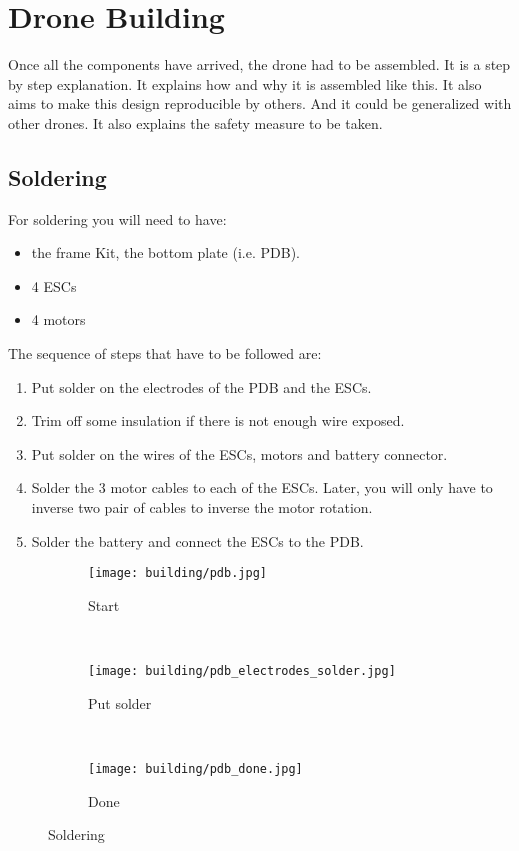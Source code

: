 \chapter{Drone Building}

Once all the components have arrived, the drone had to be assembled. It is a step by step explanation.
It explains how and why it is assembled like this.
It also aims to make this design reproducible by others.
And it could be generalized with other drones.
It also explains the safety measure to be taken.

\section{Soldering}
For soldering you will need to have:
\begin{itemize}
    \item the frame Kit, the bottom plate (i.e. PDB).
    \item 4 ESCs
    \item 4 motors
\end{itemize}
The sequence of steps that have to be followed are:
\begin{enumerate}
    \item Put solder on the electrodes of the PDB and the ESCs.
    \item Trim off some insulation if there is not enough wire exposed.
    \item Put solder on the wires of the ESCs, motors and battery connector.
    \item Solder the 3 motor cables to each of the ESCs. Later, you will only have to inverse two pair of cables to inverse the motor rotation.
    \item Solder the battery and connect the ESCs to the PDB.
\end{enumerate}
\begin{figure}[!ht]
    \centering
    \begin{subfigure}[b]{0.3\textwidth}
        \texttt{[image: building/pdb.jpg]}
        \caption{Start}
        \label{fig:pdb}
    \end{subfigure}
    ~
    \begin{subfigure}[b]{0.3\textwidth}
        \texttt{[image: building/pdb\_electrodes\_solder.jpg]}
        \caption{Put solder}
        \label{fig:pdb_electrodes_solder}
    \end{subfigure}
    ~
    \begin{subfigure}[b]{0.3\textwidth}
        \texttt{[image: building/pdb\_done.jpg]}
        \caption{Done}
        \label{fig:pdb_done}
    \end{subfigure}
    \caption{Soldering}\label{fig:soldering}
\end{figure}


